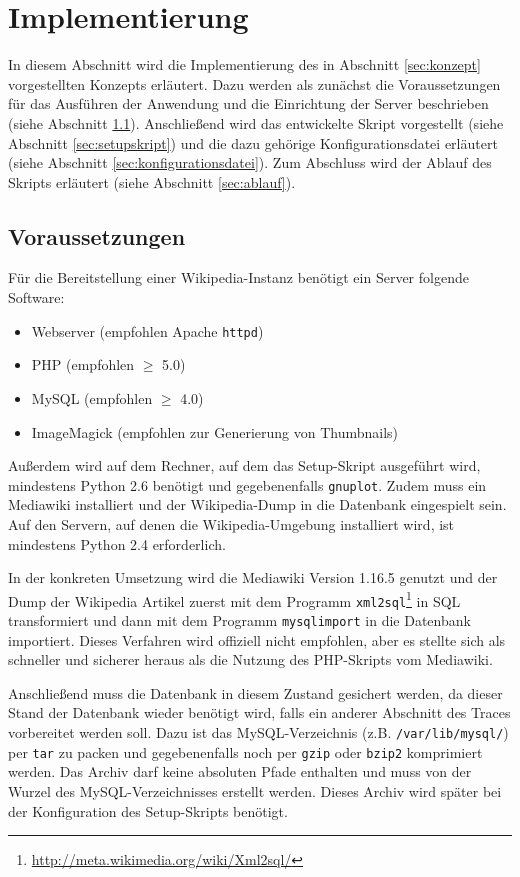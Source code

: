 \section{Implementierung}
\label{sec:implementierung}

In diesem Abschnitt wird die Implementierung des in Abschnitt \ref{sec:konzept} vorgestellten Konzepts erläutert. Dazu werden als zunächst die Voraussetzungen für das Ausführen der Anwendung und die Einrichtung der Server beschrieben (siehe Abschnitt \ref{sec:voraussetzungen}). Anschließend wird das entwickelte Skript vorgestellt (siehe Abschnitt \ref{sec:setupskript}) und die dazu gehörige Konfigurationsdatei erläutert (siehe Abschnitt \ref{sec:konfigurationsdatei}). Zum Abschluss wird der Ablauf des Skripts erläutert (siehe Abschnitt \ref{sec:ablauf}).

\subsection{Voraussetzungen}
\label{sec:voraussetzungen}

Für die Bereitstellung einer Wikipedia-Instanz benötigt ein Server folgende Software:
\begin{itemize}
\item Webserver (empfohlen Apache \texttt{httpd})
\item PHP (empfohlen $\geq$ 5.0)
\item MySQL (empfohlen $\geq$ 4.0)
\item ImageMagick (empfohlen zur Generierung von Thumbnails)
\end{itemize}

Außerdem wird auf dem Rechner, auf dem das Setup-Skript ausgeführt wird, mindestens Python 2.6 benötigt und gegebenenfalls \texttt{gnuplot}. Zudem muss ein Mediawiki installiert und der Wikipedia-Dump in die Datenbank eingespielt sein. Auf den Servern, auf denen die Wikipedia-Umgebung installiert wird, ist mindestens Python 2.4 erforderlich.

In der konkreten Umsetzung wird die Mediawiki Version 1.16.5 genutzt und der Dump der Wikipedia Artikel zuerst mit dem Programm \texttt{xml2sql}\footnote{\url{http://meta.wikimedia.org/wiki/Xml2sql/}} in SQL transformiert und dann mit dem Programm \texttt{mysqlimport} in die Datenbank importiert. Dieses Verfahren wird offiziell nicht empfohlen, aber es stellte sich als schneller und sicherer heraus als die Nutzung des PHP-Skripts vom Mediawiki.

Anschließend muss die Datenbank in diesem Zustand gesichert werden, da dieser Stand der Datenbank wieder benötigt wird, falls ein anderer Abschnitt des Traces vorbereitet werden soll. Dazu ist das MySQL-Verzeichnis (z.B. \texttt{/var/lib/mysql/}) per \texttt{tar} zu packen und gegebenenfalls noch per \texttt{gzip} oder \texttt{bzip2} komprimiert werden. Das Archiv darf keine absoluten Pfade enthalten und muss von der Wurzel des MySQL-Verzeichnisses erstellt werden. Dieses Archiv wird später bei der Konfiguration des Setup-Skripts benötigt.


